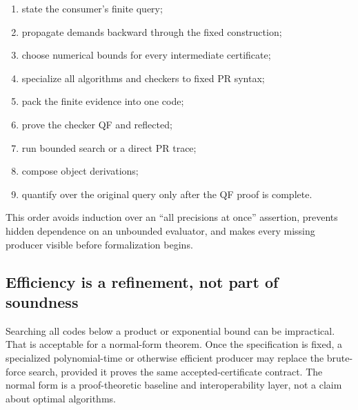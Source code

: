 \begin{enumerate}
\item state the consumer's finite query;
\item propagate demands backward through the fixed construction;
\item choose numerical bounds for every intermediate certificate;
\item specialize all algorithms and checkers to fixed PR syntax;
\item pack the finite evidence into one code;
\item prove the checker QF and reflected;
\item run bounded search or a direct PR trace;
\item compose object derivations;
\item quantify over the original query only after the QF proof is complete.
\end{enumerate}

This order avoids induction over an ``all precisions at once'' assertion,
prevents hidden dependence on an unbounded evaluator, and makes every missing
producer visible before formalization begins.

\subsection{Efficiency is a refinement, not part of soundness}

Searching all codes below a product or exponential bound can be impractical.
That is acceptable for a normal-form theorem.  Once the specification is fixed,
a specialized polynomial-time or otherwise efficient producer may replace the
brute-force search, provided it proves the same accepted-certificate contract.
The normal form is a proof-theoretic baseline and interoperability layer, not a
claim about optimal algorithms.
